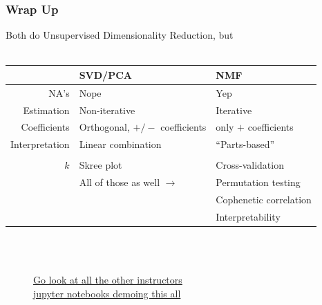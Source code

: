 \documentclass[xcolor={dvipsnames}]{beamer}
\begin{document}
\frame
{
\frametitle{Wrap Up}


Both do Unsupervised Dimensionality Reduction, but\\${}$\\



\begin{tabular}{r|ll}
& SVD/PCA & NMF \\\hline
NA's & Nope & Yep \\
Estimation & Non-iterative & Iterative \\
Coefficients & Orthogonal, $+/-$ coefficients & only $+$ coefficients  \\
Interpretation & Linear combination   & ``Parts-based''    \\\\
 $k$ & Skree plot & Cross-validation\\
 	&All of those as well $\rightarrow$ & Permutation testing\\
	&& Cophenetic correlation \\
	&& Interpretability \\
\end{tabular} 

\Large
${}$\\${}$\\
\LARGE
\begin{figure}
\centering
\underline{Go look at all the other instructors}\\
\underline{jupyter notebooks demoing this all}
\end{figure}
${}$\\${}$\\${}$\\


}
\end{document}
